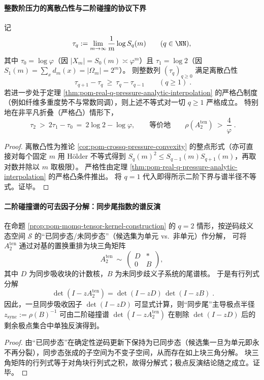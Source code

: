 \paragraph{整数阶压力的离散凸性与二阶碰撞的协议下界}
\begin{corollary}\label{cor:pom-integer-pressure-discrete-convexity-strict-bound}
记
\[
\tau_q:=\lim_{m\to\infty}\frac{1}{m}\log S_q(m)
\qquad(q\in\NN),
\]
其中 \(\tau_0=\log\varphi\)（因 \(|X_m|=S_0(m)\asymp \varphi^m\)）且 \(\tau_1=\log 2\)（因 \(S_1(m)=\sum_x d_m(x)=|\Omega_m|=2^m\)）。
则整数列 \((\tau_q)_{q\ge 0}\) 满足离散凸性
\[
\boxed{\;
\tau_{q+1}-\tau_q\ \ge\ \tau_q-\tau_{q-1}\qquad(q\ge 1)\; }.
\]
若进一步处于定理 \ref{thm:pom-real-q-pressure-analytic-interpolation} 的严格凸制度（例如纤维多重度势不与常数同调），则上述不等式对一切 \(q\ge 1\) 严格成立。
特别地在非平凡折叠（严格凸）情形下，
\[
\boxed{\;
\tau_2\ >\ 2\tau_1-\tau_0\ =\ 2\log 2-\log\varphi,
\qquad\text{等价地}\qquad
\rho\!\left(A_2^{\mathrm{ten}}\right)\ >\ \frac{4}{\varphi}\; }.
\]
\end{corollary}
\begin{proof}
离散凸性为推论 \ref{cor:pom-crossq-pressure-convexity} 的整点形式（亦可直接对每个固定 \(m\) 用 Hölder 不等式得到 \(S_q(m)^2\le S_{q-1}(m)S_{q+1}(m)\)，再取对数并除以 \(m\) 取极限）。
严格性由定理 \ref{thm:pom-real-q-pressure-analytic-interpolation} 的严格凸条件推出。
将 \(q=1\) 代入即得所示二阶下界与谱半径不等式。证毕。
\end{proof}

\paragraph{二阶碰撞谱的可去因子分解：同步尾指数的谱反演}
\begin{proposition}\label{prop:pom-collision-zeta-removable-sync-factor}
在命题 \ref{prop:pom-momq-tensor-kernel-construction} 的 \(q=2\) 情形，按逆码歧义态空间 \(\mathcal S\) 的“已同步态/未同步态”（候选集为单元 vs.\ 非单元）作分解，
可将 \(A_2^{\mathrm{ten}}\) 通过对基的置换重排为块三角矩阵
\[
A_2^{\mathrm{ten}}\ \sim\
\begin{pmatrix}
D & *\\
0 & B
\end{pmatrix},
\]
其中 \(D\) 为同步吸收块的计数核，\(B\) 为未同步歧义子系统的尾谱核。
于是有行列式分解
\[
\boxed{\;
\det(I-zA_2^{\mathrm{ten}})
=
\det(I-zD)\,\det(I-zB)\; }.
\]
因此，一旦同步吸收因子 \(\det(I-zD)\) 可显式计算，则“同步尾”主导极点半径 \(z_{\mathrm{sync}}:=\rho(B)^{-1}\) 可由二阶碰撞谱
\(\det(I-zA_2^{\mathrm{ten}})\)
在剔除 \(\det(I-zD)\) 后的剩余极点集合中单独反演得到。
\end{proposition}
\begin{proof}
由“已同步态”在确定性逆码更新下保持为已同步态（候选集一旦为单元即永不再分裂），同步态张成的子空间为不变子空间，从而存在如上块三角分解。
块三角矩阵的行列式等于对角块行列式之积，故得分解式；极点反演结论随之成立。证毕。
\end{proof}


